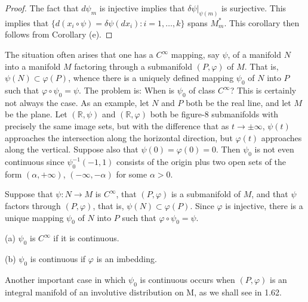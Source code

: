 \begin{proof}
	The fact that $d\psi_m$ is injective implies that $\delta\psi|_{\psi(m)}$ is surjective. This implies that $\{d(x_i \circ \psi) = \delta\psi(dx_i)\colon i = 1, \ldots, k\}$ spans $M_m^*$. This corollary then follows from Corollary (e).
\end{proof}

\label{thm:1.31}
The situation often arises that one has a $C^{\infty}$ mapping, say $\psi$, of a manifold $N$ into a manifold $M$ factoring through a submanifold $(P,\varphi)$ of $M$. That is, $\psi(N) \subset \varphi(P)$, whence there is a uniquely defined mapping $\psi_0$ of $N$ into $P$ such that $\varphi \circ \psi_0 = \psi$. The problem is: When is $\psi_0$ of class $C^{\infty}$? This is certainly not always the case. As an example, let $N$ and $P$ both be the real line, and let $M$ be the plane. Let $(\mathbb{R},\psi)$ and $(\mathbb{R},\varphi)$ both be figure-8 submanifolds with precisely the same image sets, but with the difference that as $t \to \pm \infty$, $\psi(t)$ approaches the intersection along the horizontal direction, but $\varphi(t)$ approaches along the vertical. Suppose also that $\psi(0) = \varphi(0) = 0$. Then $\psi_0$ is not even continuous since $\psi_0^{-1}(-1,1)$ consists of the origin plus two open sets of the form $(\alpha,+\infty)$, $(-\infty,-\alpha)$ for some $\alpha > 0$.

\begin{center}
\end{center}

\begin{center}
\end{center}

\begin{theorem}\label{thm:1.32}
	Suppose that $\psi: N \to M$ is $C^\infty$, that $(P, \varphi)$ is a submanifold of $M$, and that $\psi$ factors through $(P, \varphi)$, that is, $\psi(N) \subset \varphi(P)$. Since $\varphi$ is injective, there is a unique mapping $\psi_0$ of $N$ into $P$ such that $\varphi \circ \psi_0 = \psi$.

	\begin{center}
	\end{center}

	(a)  $ \psi_{0} $ is  $ C^{\infty} $ if it is continuous.

	(b)  $ \psi_{0} $ is continuous if  $ \varphi $ is an imbedding.

	Another important case in which $\psi_{0}$ is continuous occurs when  $ (P,\varphi) $ is an integral manifold of an involutive distribution on M, as we shall see in 1.62.

\end{theorem}

